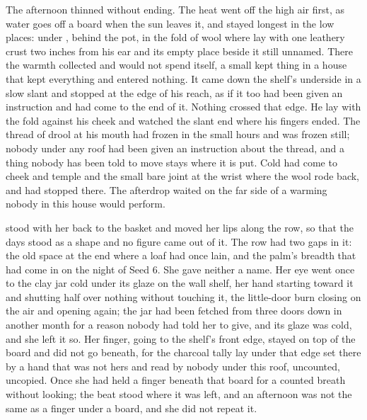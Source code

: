 The afternoon thinned without ending. The heat went off the high air first, as water goes off a board when the sun leaves it, and stayed longest in the low places: under , behind the pot, in the fold of wool where  lay with one leathery crust two inches from his ear and its empty place beside it still unnamed. There the warmth collected and would not spend itself, a small kept thing in a house that kept everything and entered nothing. It came down the shelf's underside in a slow slant and stopped at the edge of his reach, as if it too had been given an instruction and had come to the end of it. Nothing crossed that edge. He lay with the fold against his cheek and watched the slant end where his fingers ended. The thread of drool at his mouth had frozen in the small hours and was frozen still; nobody under any roof had been given an instruction about the thread, and a thing nobody has been told to move stays where it is put. Cold had come to cheek and temple and the small bare joint at the wrist where the wool rode back, and had stopped there. The afterdrop waited on the far side of a warming nobody in this house would perform.

 stood with her back to the basket and moved her lips along the row, so that the days stood as a shape and no figure came out of it. The row had two gaps in it: the old space at the end where a loaf had once lain, and the palm's breadth that had come in on the night of Seed 6. She gave neither a name. Her eye went once to the clay jar cold under its glaze on the wall shelf, her hand starting toward it and shutting half over nothing without touching it, the little-door burn closing on the air and opening again; the jar had been fetched from three doors down in another month for a reason nobody had told her to give, and its glaze was cold, and she left it so. Her finger, going to the shelf's front edge, stayed on top of the board and did not go beneath, for the charcoal tally lay under that edge set there by a hand that was not hers and read by nobody under this roof, uncounted, uncopied. Once she had held a finger beneath that board for a counted breath without looking; the beat stood where it was left, and an afternoon was not the same as a finger under a board, and she did not repeat it.

